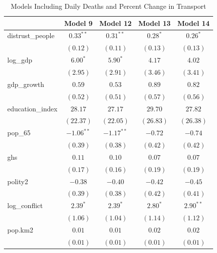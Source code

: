 \documentclass[
  11pt,
]{article}
\begin{document}
\begin{table}
\caption{Models Including Daily Deaths and Percent Change in Transport}
\begin{center}
\begin{tabular}{l c c c c}
\hline
 & Model 9 & Model 12 & Model 13 & Model 14 \\
\hline
distrust\_people          & $0.33^{**}$  & $0.31^{**}$  & $0.28^{*}$    & $0.26^{*}$    \\
                          & $(0.12)$     & $(0.11)$     & $(0.13)$      & $(0.13)$      \\
log\_gdp                  & $6.00^{*}$   & $5.90^{*}$   & $4.17$        & $4.02$        \\
                          & $(2.95)$     & $(2.91)$     & $(3.46)$      & $(3.41)$      \\
gdp\_growth               & $0.59$       & $0.53$       & $0.89$        & $0.82$        \\
                          & $(0.52)$     & $(0.51)$     & $(0.57)$      & $(0.56)$      \\
education\_index          & $28.17$      & $27.17$      & $29.70$       & $27.82$       \\
                          & $(22.37)$    & $(22.05)$    & $(26.83)$     & $(26.38)$     \\
pop\_65                   & $-1.06^{**}$ & $-1.17^{**}$ & $-0.72$       & $-0.74$       \\
                          & $(0.39)$     & $(0.38)$     & $(0.42)$      & $(0.42)$      \\
ghs                       & $0.11$       & $0.10$       & $0.07$        & $0.07$        \\
                          & $(0.17)$     & $(0.16)$     & $(0.19)$      & $(0.19)$      \\
polity2                   & $-0.38$      & $-0.40$      & $-0.42$       & $-0.45$       \\
                          & $(0.39)$     & $(0.38)$     & $(0.42)$      & $(0.41)$      \\
log\_conflict             & $2.39^{*}$   & $2.39^{*}$   & $2.80^{*}$    & $2.90^{**}$   \\
                          & $(1.06)$     & $(1.04)$     & $(1.14)$      & $(1.12)$      \\
pop.km2                   & $0.01$       & $0.01$       & $0.02$        & $0.02$        \\
                          & $(0.01)$     & $(0.01)$     & $(0.01)$      & $(0.01)$      \\

\end{tabular}
\end{center}
\end{table}
\end{document}
